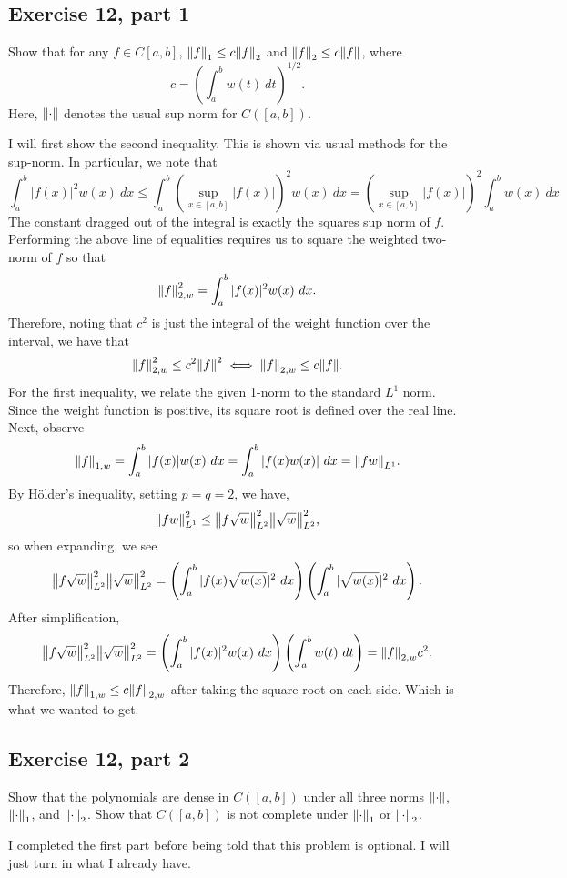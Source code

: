 \subsection{Exercise 12, part 1}
Show that for any $f \in C[a, b]$, $\norm{f}_1 \leq c\norm{f}_2$ and $\norm{f}_2 \leq c\norm{f}$, where 
\[c = \left(\int_a^b w(t) \ dt\right)^{1/2}.\]
Here, $\norm{\cdot}$ denotes the usual sup norm for $C([a, b])$. 
\partbreak
\begin{solution}

    I will first show the second inequality. This is shown via usual methods for the sup-norm. In particular, we note that 
    \[\int_a^b |f(x)|^2 w(x) \ dx \leq \int_a^b \left( \sup_{x \in [a, b]} |f(x)|\right)^2 w(x) \ dx = \left( \sup_{x \in [a, b]} |f(x)|\right)^2 \int_a^b w(x) \ dx\]
    The constant dragged out of the integral is exactly the squares sup norm of $f$. Performing the above line of equalities requires us to square the weighted two-norm of $f$ so that
    \[\norm{f}_{2, w}^2 = \int_a^b |f(x)|^2 w(x) \ dx .\]
    Therefore, noting that $c^2$ is just the integral of the weight function over the interval, we have that 
    \[\norm{f}_{2, w}^2 \leq c^2\norm{f}^2 \iff \norm{f}_{2, w} \leq c\norm{f}.\]
    For the first inequality, we relate the given 1-norm to the standard $L^1$ norm. Since the weight function is positive, its square root is defined over the real line. Next, observe
    \[\norm{f}_{1, w} = \int_a^b |f(x)| w(x) \ dx =  \int_a^b |f(x) w(x)| \ dx = \norm{fw}_{L^1}.\]
    By H\"older's inequality, setting $p = q = 2$, we have, 
    \[\norm{fw}_{L^1}^2 \leq \norm{f\sqrt{w}}_{L^2}^2 \norm{\sqrt{w}}_{L^2}^2,\]
    so when expanding, we see
    \[\norm{f\sqrt{w}}_{L^2}^2 \norm{\sqrt{w}}_{L^2}^2 = \left(\int_a^b |f(x)\sqrt{w(x)}|^2 \ dx \right)\left( \int_a^b |\sqrt{w(x)}|^2 \ dx\right).\]
    After simplification, 
    \[\norm{f\sqrt{w}}_{L^2}^2 \norm{\sqrt{w}}_{L^2}^2 = \left(\int_a^b |f(x)|^2 w(x) \ dx\right) \left(\int_a^b w(t) \ dt\right) = \norm{f}_{2, w} c^2 .\]
    Therefore, $\norm{f}_{1, w} \leq c \norm{f}_{2, w}$ after taking the square root on each side. Which is what we wanted to get. 
    
\end{solution}


\newpage
\subsection{Exercise 12, part 2}
Show that the polynomials are dense in $C([a, b])$ under all three norms $\norm{\cdot}$, $\norm{\cdot}_1$, and $\norm{\cdot}_2$. Show that $C([a, b])$ is not complete under $\norm{\cdot}_1$ or $\norm{\cdot}_2$. 
\partbreak
\begin{solution}

    I completed the first part before being told that this problem is optional. I will just turn in what I already have. 
\end{solution}
\newcommand{\pstar}{p_*}


